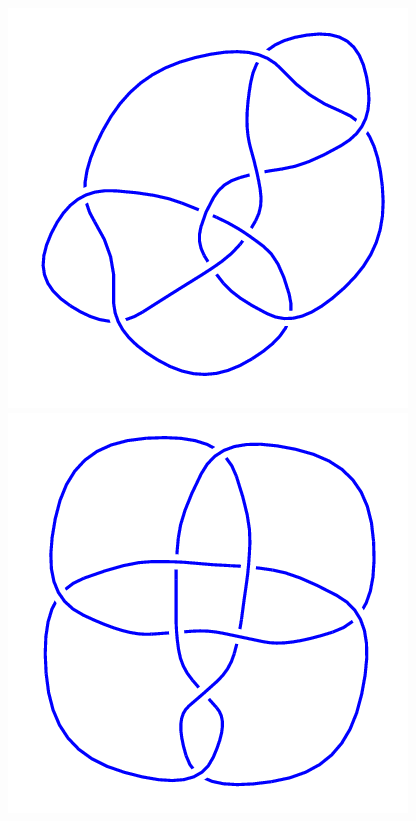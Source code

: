 \begin{figure}[H]
\begin{minipage}[b]{.18\linewidth}
    \end{minipage}
    \begin{minipage}[b]{.18\linewidth}
        \centering
        \includegraphics[width=\linewidth]{../data/9_33.png}
    \end{minipage}
    \begin{minipage}[b]{.18\linewidth}
        \centering
        \includegraphics[width=\linewidth]{../data/9_34.png}

\end{minipage}
\end{figure}
